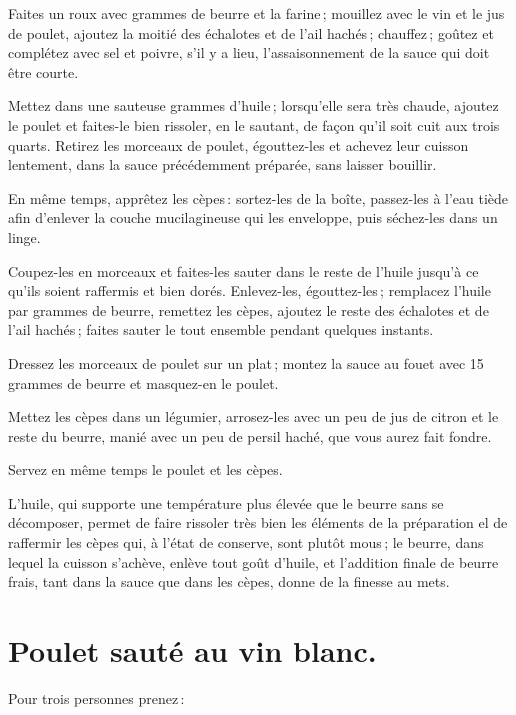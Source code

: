 Faites un roux avec {\mmm} grammes de beurre et la farine ; mouillez avec le vin et
le jus de poulet, ajoutez la moitié des échalotes et de l'ail hachés ;
chauffez ; goûtez et complétez avec sel et poivre, s'il y a lieu,
l'assaisonnement de la sauce qui doit être courte.

Mettez dans une sauteuse {\mmm} grammes d'huile ; lorsqu'elle sera très chaude,
ajoutez le poulet et faites-le bien rissoler, en le sautant, de façon qu'il
soit cuit aux trois quarts. Retirez les morceaux de poulet, égouttez-les et
achevez leur cuisson lentement, dans la sauce précédemment préparée, sans
laisser bouillir.

En même temps, apprêtez les cèpes : sortez-les de la boîte, passez-les à l'eau
tiède afin d'enlever la couche mucilagineuse qui les enveloppe, puis séchez-les
dans un linge.

Coupez-les en morceaux et faites-les sauter dans le reste de l'huile jusqu'à ce
qu'ils soient raffermis et bien dorés. Enlevez-les, égouttez-les ; remplacez
l'huile par {\mmm} grammes de beurre, remettez les cèpes, ajoutez le reste des
échalotes et de l'ail hachés ; faites sauter le tout ensemble pendant quelques
instants.

Dressez les morceaux de poulet sur un plat ; montez la sauce au fouet avec 15
grammes de beurre et masquez-en le poulet.

Mettez les cèpes dans un légumier, arrosez-les avec un peu de jus de citron et
le reste du beurre, manié avec un peu de persil haché, que vous aurez fait
fondre.

Servez en même temps le poulet et les cèpes.

L'huile, qui supporte une température plus élevée que le beurre sans se
décomposer, permet de faire rissoler très bien les éléments de la préparation
el de raffermir les cèpes qui, à l'état de conserve, sont plutôt mous ; le
beurre, dans lequel la cuisson s'achève, enlève tout goût d'huile, et
l'addition finale de beurre frais, tant dans la sauce que dans les cèpes, donne
de la finesse au mets.

\section*{\centering Poulet sauté au vin blanc.}
{}

Pour trois personnes prenez :

